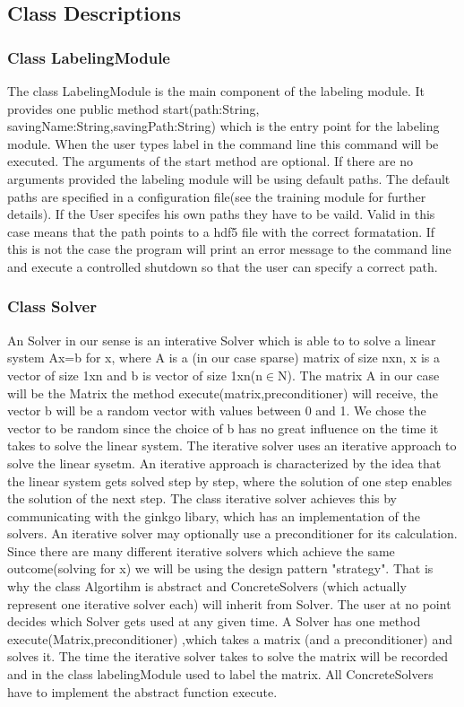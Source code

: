 \documentclass[parskip=full]{scrartcl}
\begin{document}
\subsection{Class Descriptions}

\subsubsection{Class LabelingModule}
The class LabelingModule is the main component of the labeling module. It provides one public method start(path:String, savingName:String,savingPath:String) which is the entry point for the labeling module. When the user types label in the command line this command will be executed. The arguments of the start method are optional. If there are no arguments provided the labeling module will be using default paths. The default paths are specified in a configuration file(see the training module for further details). If the User specifes his own paths they have to be vaild. Valid in this case means that the path points to a hdf5 file with the correct formatation. If this is not the case the program will print an error message to the command line and execute a controlled shutdown so that the user can specify a correct path.
\subsubsection{Class Solver}
An Solver in our sense is an interative Solver which is able to to solve a linear system Ax=b for x, where A is a (in our case sparse) matrix of size nxn, x is a vector of size 1xn and b is vector of size 1xn(n$\in$N). The matrix A in our case will be the Matrix the method execute(matrix,preconditioner) will receive, the vector b will be a random vector with values between 0 and 1. We chose the vector to be random since the choice of b has no great influence on the time it takes to solve the linear system.
The \gls{iterative solver} uses an iterative approach to solve the linear sysetm. An iterative approach is characterized by the idea that the linear system gets solved step by step, where the solution of one step enables the solution of the next step. The class \gls{iterative solver} achieves this by communicating with the ginkgo libary, which has an implementation of the solvers. An \gls{iterative solver} may optionally use a \gls{preconditioner} for its calculation. Since there are many different \gls{iterative solver}s which achieve the same outcome(solving for x) we will be using the design pattern "\gls{strategy}". That is why the class Algortihm is abstract and ConcreteSolvers (which actually represent one \gls{iterative solver} each) will inherit from Solver. The user at no point decides which Solver gets used at any given time. \newline
A Solver has one method execute(Matrix,\gls{preconditioner}) ,which takes a matrix (and a \gls{preconditioner}) and solves it. The time the \gls{iterative solver} takes to solve the matrix will be recorded and in the class labelingModule used to label the matrix. All ConcreteSolvers have to implement the abstract function execute.
\end{document}
